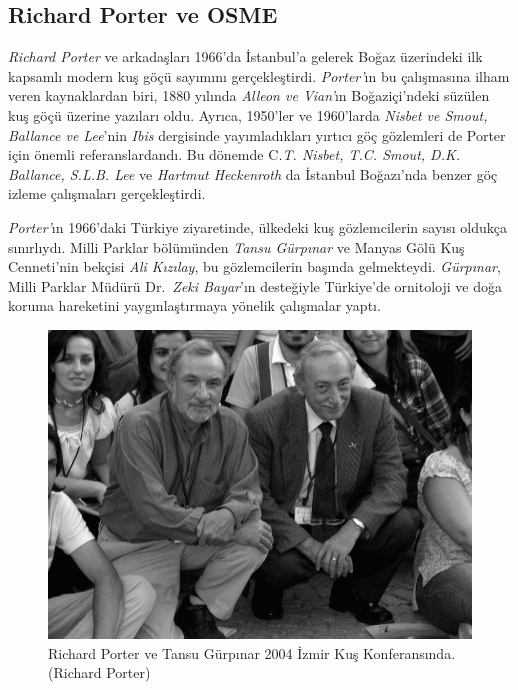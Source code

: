 \documentclass[
  a4paper,
  DIV=11,
  numbers=noendperiod]{scrreprt}
\begin{document}
\subsection*{Richard Porter ve OSME}\label{richard-porter-ve-osme}

\emph{Richard Porter} ve arkadaşları 1966'da İstanbul'a gelerek Boğaz
üzerindeki ilk kapsamlı modern kuş göçü sayımını gerçekleştirdi.
\emph{Porter'}ın bu çalışmasına ilham veren kaynaklardan biri, 1880
yılında \emph{Alleon ve Vian'}ın Boğaziçi'ndeki süzülen kuş göçü üzerine
yazıları oldu. Ayrıca, 1950'ler ve 1960'larda \emph{Nisbet ve Smout,}
\emph{Ballance ve Lee}'nin \emph{Ibis} dergisinde yayımladıkları yırtıcı
göç gözlemleri de Porter için önemli referanslardandı. Bu dönemde
C\emph{.T. Nisbet, T.C. Smout, D.K. Ballance, S.L.B. Lee} ve
\emph{Hartmut Heckenroth} da İstanbul Boğazı'nda benzer göç izleme
çalışmaları gerçekleştirdi.

\emph{Porter'}ın 1966'daki Türkiye ziyaretinde, ülkedeki kuş
gözlemcilerin sayısı oldukça sınırlıydı. Milli Parklar bölümünden
\emph{Tansu Gürpınar} ve Manyas Gölü Kuş Cenneti'nin bekçisi \emph{Ali
Kızılay}, bu gözlemcilerin başında gelmekteydi. \emph{Gürpınar}, Milli
Parklar Müdürü Dr.~\emph{Zeki Bayar}'ın desteğiyle Türkiye'de ornitoloji
ve doğa koruma hareketini yaygınlaştırmaya yönelik çalışmalar yaptı.

\begin{figure}[H]

{\centering \includegraphics[width=6.25in,height=\textheight]{images/richard_tansu.gif}

}

\caption{Richard Porter ve Tansu Gürpınar 2004 İzmir Kuş Konferansında.
(Richard Porter)}

\end{figure}%
\end{document}
